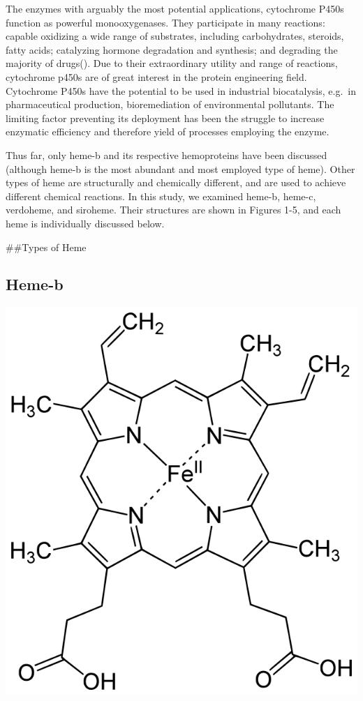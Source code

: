 \documentclass[a4paper, nobind]{templates/ociamthesis}
\let\origfigure\figure
\let\endorigfigure\endfigure
\renewenvironment{figure}[1][2] {
    \expandafter\origfigure\expandafter[H]
} {
    \endorigfigure
}
\begin{document}
The enzymes with arguably the most potential applications, cytochrome P450s function as powerful monooxygenases. They participate in many reactions: capable oxidizing a wide range of substrates, including carbohydrates, steroids, fatty acids; catalyzing hormone degradation and synthesis; and degrading the majority of drugs(\textcite{Poulos2014}). Due to their extraordinary utility and range of reactions, cytochrome p450s are of great interest in the protein engineering field. Cytochrome P450s have the potential to be used in industrial biocatalysis, e.g.~in pharmaceutical production, bioremediation of environmental pollutants\autocite{Du2017,Lalonde2016}. The limiting factor preventing its deployment has been the struggle to increase enzymatic efficiency and therefore yield of processes employing the enzyme\autocite{Girvan2016,Li2020}.

Thus far, only heme-b and its respective hemoproteins have been discussed (although heme-b is the most abundant and most employed type of heme). Other types of heme are structurally and chemically different, and are used to achieve different chemical reactions. In this study, we examined heme-b, heme-c, verdoheme, and siroheme. Their structures are shown in Figures 1-5, and each heme is individually discussed below.

\#\#Types of Heme

\hypertarget{heme-b}{%
\subsection{Heme-b}\label{heme-b}}

\begin{figure}

{\centering \includegraphics[width=0.5\linewidth]{figures/HEM} 

}

\caption{Heme-b (HEM)}\label{fig:structHEM}
\end{figure}
\end{document}
